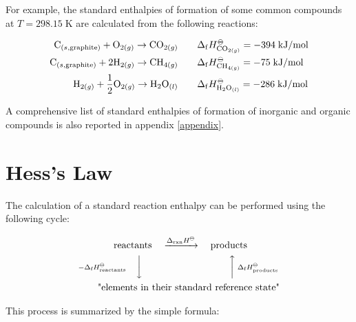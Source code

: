 \documentclass[
  9pt,
]{extbook}
\theoremstyle{definition}
\theoremstyle{definition}
\theoremstyle{definition}
\theoremstyle{remark}
\begin{document}
For example, the standard enthalpies of formation of some common compounds at \(T = 298.15 \; \mathrm{K}\) are calculated from the following reactions:

\begin{equation}
\begin{aligned}
  \mathrm{C}_{(s,\text{graphite})}+\mathrm{O}_{2(g)} \rightarrow \mathrm{CO}_{2(g)} \qquad & \Delta_{\mathrm{f}} H_{\mathrm{CO}_{2(g)}}^{-\kern-6pt{\ominus}\kern-6pt-}= -394 \; \text{kJ/mol} \\
   \mathrm{C}_{(s,\text{graphite})}+2 \mathrm{H}_{2(g)} \rightarrow \mathrm{CH}_{4(g)} \qquad & \Delta_{\mathrm{f}} H_{\mathrm{CH}_{4(g)}}^{-\kern-6pt{\ominus}\kern-6pt-}= -75 \; \text{kJ/mol} \\ 
   \mathrm{H}_{2(g)}+\frac{1}{2} \mathrm{O}_{2(g)} \rightarrow \mathrm{H}_2 \mathrm{O}_{(l)} \qquad & \Delta_{\mathrm{f}} H_{\mathrm{H}_2 \mathrm{O}_{(l)}}^{-\kern-6pt{\ominus}\kern-6pt-}= -286 \; \text{kJ/mol} 
\end{aligned}
\label{eq:someDfH}
\end{equation}

A comprehensive list of standard enthalpies of formation of inorganic and organic compounds is also reported in appendix \ref{appendix}.

\hypertarget{hessslaw}{%
\section{Hess's Law}\label{hessslaw}}

The calculation of a standard reaction enthalpy can be performed using the following cycle:

\begin{equation}
\begin{aligned}
 \text{reactants} & \quad \xrightarrow{\Delta_{\text{rxn}} H^{-\kern-6pt{\ominus}\kern-6pt-}} \quad \text{products} \\
\scriptstyle{-\Delta_{\text{f}} H_{\text{reactants}}^{-\kern-6pt{\ominus}\kern-6pt-}} \quad \bigg\downarrow \quad & \qquad \qquad \qquad \qquad \scriptstyle{\bigg\uparrow  \; \Delta_{\text{f}} H_{\text{products}}^{-\kern-6pt{\ominus}\kern-6pt-}} \\
 \text{"elements in } & \text{their standard reference state"}
\end{aligned}
\label{eq:Hesscycle}
\end{equation}

This process is summarized by the simple formula:
\end{document}
